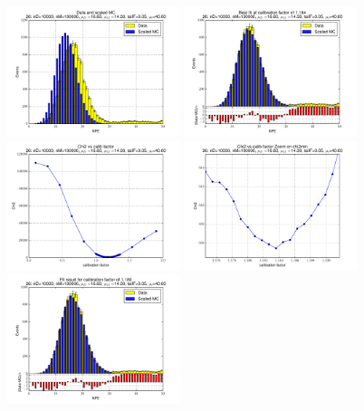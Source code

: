 
 \begin{figure}[htbp] \begin{center} 
\includegraphics[width=0.45\textwidth]{../FIGURES/26/FIG_Data_and_scaled_MC.pdf} 
\includegraphics[width=0.45\textwidth]{../FIGURES/26/FIG_Best_fit_at_calibration_factor_of_1_184.pdf} 
\includegraphics[width=0.45\textwidth]{../FIGURES/26/FIG_Chi2_vs_calib_factor.pdf} 
\includegraphics[width=0.45\textwidth]{../FIGURES/26/FIG_Chi2_vs_calib_factor_Zoom_on_chi2min.pdf} 
\includegraphics[width=0.45\textwidth]{../FIGURES/26/FIG_Fit_result_for_calibration_factor_of_1_180.pdf} 

\end{center}
\end{figure}
